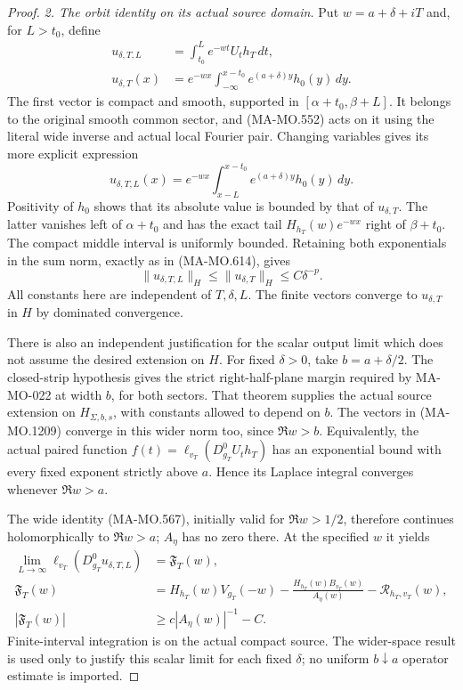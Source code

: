 \begin{proof}
\emph{2. The orbit identity on its actual source domain.}
Put $w=a+\delta+iT$ and, for $L>t_0$, define
\[
 \begin{aligned}
 u_{\delta,T,L}
      &=\int_{t_0}^{L}e^{-wt}U_th_T\,dt,\\
 u_{\delta,T}(x)
      &=e^{-wx}\int_{-\infty}^{x-t_0}
                         e^{(a+\delta)y}h_0(y)\,dy .
 \end{aligned}
 \tag{MA-MO.1209}
\]
The first vector is compact and smooth, supported in
$[\alpha+t_0,\beta+L]$.  It belongs to the original smooth
common sector, and (MA-MO.552) acts on it using the literal
wide inverse and actual local Fourier pair.
Changing variables gives its more explicit expression
\[
 u_{\delta,T,L}(x)=e^{-wx}
       \int_{x-L}^{x-t_0}e^{(a+\delta)y}h_0(y)\,dy.
 \tag{MA-MO.1210}
\]
Positivity of $h_0$ shows that its absolute value is bounded
by that of $u_{\delta,T}$.  The latter vanishes left of
$\alpha+t_0$ and has the exact tail
$H_{h_T}(w)e^{-wx}$ right of $\beta+t_0$.
The compact middle interval is uniformly bounded.  Retaining
both exponentials in the sum norm, exactly as in (MA-MO.614),
gives
\[
 \|u_{\delta,T,L}\|_H
       \le\|u_{\delta,T}\|_H\le C\delta^{-p}.
 \tag{MA-MO.1211}
\]
All constants here are independent of $T,\delta,L$.
The finite vectors converge to $u_{\delta,T}$ in $H$ by
dominated convergence.

There is also an independent justification for the scalar
output limit which does not assume the desired extension on
$H$.  For fixed $\delta>0$, take $b=a+\delta/2$.
The closed-strip hypothesis gives the strict right-half-plane
margin required by MA-MO-022 at width $b$, for both sectors.
That theorem supplies the actual source extension on
$H_{\Sigma,b,s}$, with constants allowed to depend on $b$.
The vectors in (MA-MO.1209) converge in this wider norm too,
since $\Re w>b$.  Equivalently, the actual paired function
$f(t)=\ell_{v_T}(D_{g_T}^0U_th_T)$ has an exponential bound
with every fixed exponent strictly above $a$.  Hence its
Laplace integral converges whenever $\Re w>a$.

The wide identity (MA-MO.567), initially valid for
$\Re w>1/2$, therefore continues holomorphically to
$\Re w>a$; $A_\eta$ has no zero there.  At the specified
$w$ it yields
\[
 \begin{aligned}
 \lim_{L\to\infty}\ell_{v_T}(D_{g_T}^0u_{\delta,T,L})
   &=\mathfrak F_T(w),\\
 \mathfrak F_T(w)
   &=H_{h_T}(w)V_{g_T}(-w)
       -\frac{H_{h_T}(w)B_{v_T}(w)}{A_\eta(w)}
       -\mathcal R_{h_T,v_T}(w),\\
 |\mathfrak F_T(w)|&\ge c|A_\eta(w)|^{-1}-C.
 \end{aligned}
 \tag{MA-MO.1212}
\]
Finite-interval integration is on the actual compact source.
The wider-space result is used only to justify this scalar
limit for each fixed $\delta$; no uniform $b\downarrow a$
operator estimate is imported.


\end{proof}

